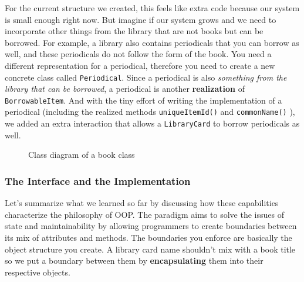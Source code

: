 For the current structure we created, this feels like extra code because
our system is small enough right now. But imagine if our system grows
and we need to incorporate other things from the library that are not
books but can be borrowed. For example, a library also contains
periodicals that you can borrow as well, and these periodicals do not
follow the form of the book. You need a different representation for a
periodical, therefore you need to create a new concrete class called
\texttt{Periodical}. Since a periodical is also \emph{something from the
library that can be borrowed}, a periodical is another
\textbf{realization} of \texttt{BorrowableItem}. And with the tiny
effort of writing the implementation of a periodical (including the
realized methods \texttt{uniqueItemId()} and \texttt{commonName()} ), we
added an extra interaction that allows a \texttt{LibraryCard} to borrow
periodicals as well.

\begin{figure}
\centering
{}
\caption{Class diagram of a book class}
\end{figure}

\subsubsection{The Interface and the
Implementation}\label{object-oriented-programming-paradigm.md__the-interface-and-the-implementation}

Let's summarize what we learned so far by discussing how these
capabilities characterize the philosophy of OOP. The paradigm aims to
solve the issues of state and maintainability by allowing programmers to
create boundaries between its mix of attributes and methods. The
boundaries you enforce are basically the object structure you create. A
library card name shouldn't mix with a book title so we put a boundary
between them by \textbf{encapsulating} them into their respective
objects.

